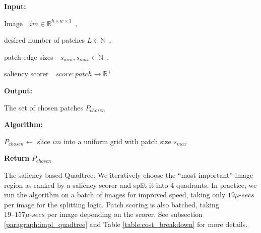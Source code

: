 \begin{algorithm}[t!]
\footnotesize
\textbf{Input:}

Image~~$im\in\mathbb{R}^{h \times w \times 3}$~,

\vspace*{1pt}
desired number of patches $L \in \mathbb{N}$~,

\vspace*{1pt}
patch edge sizes~~$s_{min},s_{max} \in \mathbb{N}$~,

\vspace*{1pt}
saliency scorer~~$score: patch \to \mathbb{R}^+$

\vspace*{1pt}
\textbf{Output:}

The set of chosen patches $P_{chosen}$

\vspace*{6pt}
\textbf{Algorithm:}

\vspace*{1pt}
$P_{chosen} \gets$ slice $im$ into a uniform grid with patch size $s_{max}$

\vspace*{3pt}

\vspace*{3pt}

\textbf{Return} $P_{chosen}$

\vspace*{10pt}

\caption{\small The saliency-based Quadtree. We iteratively choose the ``most important'' image region as ranked by a saliency scorer and split it into 4 quadrants. In practice, we run the algorithm on a batch of images for improved speed, taking only $19 \mu\text{-}secs$ per image for the splitting logic. Patch scoring is also batched, taking $19\text{--}157 \mu\text{-}secs$ per image depending on the scorer. See subsection \ref{paragraph:impl_quadtree} and Table \ref{table:cost_breakdown} for more details.}
\label{algorithm:quadtree}
\end{algorithm}